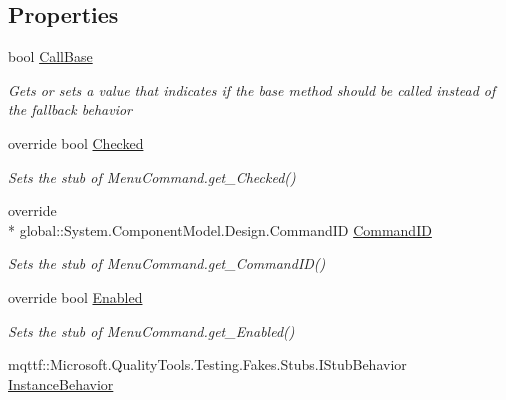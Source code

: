 \subsection*{Properties}
\begin{DoxyCompactItemize}
\item 
bool \hyperlink{class_system_1_1_component_model_1_1_design_1_1_fakes_1_1_stub_designer_verb_a5707412dcb008b25081a6b4b2035777d}{Call\-Base}
\begin{DoxyCompactList}\small\item\em Gets or sets a value that indicates if the base method should be called instead of the fallback behavior\end{DoxyCompactList}\item 
override bool \hyperlink{class_system_1_1_component_model_1_1_design_1_1_fakes_1_1_stub_designer_verb_a8271d8370e0ba402d1a15da40b466018}{Checked}
\begin{DoxyCompactList}\small\item\em Sets the stub of Menu\-Command.\-get\-\_\-\-Checked()\end{DoxyCompactList}\item 
override \\*
global\-::\-System.\-Component\-Model.\-Design.\-Command\-I\-D \hyperlink{class_system_1_1_component_model_1_1_design_1_1_fakes_1_1_stub_designer_verb_a5d4d6a7f84892157267f400bce8ff55d}{Command\-I\-D}
\begin{DoxyCompactList}\small\item\em Sets the stub of Menu\-Command.\-get\-\_\-\-Command\-I\-D()\end{DoxyCompactList}\item 
override bool \hyperlink{class_system_1_1_component_model_1_1_design_1_1_fakes_1_1_stub_designer_verb_a3dd3bae644b19c35b16fba384d0d342a}{Enabled}
\begin{DoxyCompactList}\small\item\em Sets the stub of Menu\-Command.\-get\-\_\-\-Enabled()\end{DoxyCompactList}\item 
mqttf\-::\-Microsoft.\-Quality\-Tools.\-Testing.\-Fakes.\-Stubs.\-I\-Stub\-Behavior \hyperlink{class_system_1_1_component_model_1_1_design_1_1_fakes_1_1_stub_designer_verb_a0ff008de9f14727a32f454c5b1a492fc}{Instance\-Behavior}

\end{DoxyCompactItemize}
